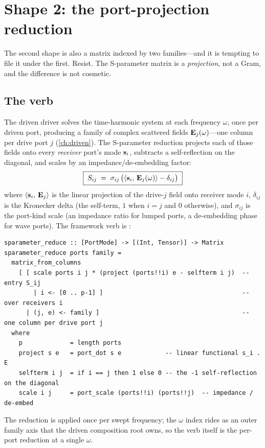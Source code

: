 \section{Shape 2: the port-projection reduction}
\label{sec:proj}

The second shape is also a matrix indexed by two families---and it is tempting to
file it under the first. Resist. The S-parameter matrix is a \emph{projection},
not a Gram, and the difference is not cosmetic.

\subsection{The verb}

The driven driver solves the time-harmonic system at each frequency $\omega$,
once per driven port, producing a family of complex scattered fields
$\mathbf{E}_j(\omega)$---one column per drive port $j$ (\cref{ch:driven}). The
S-parameter reduction projects each of those fields onto every \emph{receiver}
port's mode $\mathbf{s}_i$, subtracts a self-reflection on the diagonal, and scales by
an impedance/de-embedding factor:
\begin{equation}
  \boxed{\;S_{ij} \;=\; \sigma_{ij}\,\bigl(\left\langle \mathbf{s}_i,\, \mathbf{E}_j(\omega)\right\rangle - \delta_{ij}\bigr)\;}
  \label{eq:sparam-entry}
\end{equation}
where $\left\langle \mathbf{s}_i,\, \mathbf{E}_j\right\rangle$ is the linear projection of the drive-$j$ field onto
receiver mode $i$, $\delta_{ij}$ is the Kronecker delta (the self-term, $1$ when
$i=j$ and $0$ otherwise), and $\sigma_{ij}$ is the port-kind scale (an impedance
ratio for lumped ports, a de-embedding phase for wave ports). The framework verb
is :
\begin{lstlisting}[style=l4style]
sparameter_reduce :: [PortMode] -> [(Int, Tensor)] -> Matrix
sparameter_reduce ports family =
  matrix_from_columns
    [ [ scale ports i j * (project (ports!!i) e - selfterm i j)  -- entry S_ij
        | i <- [0 .. p-1] ]                                      -- over receivers i
      | (j, e) <- family ]                                       -- one column per drive port j
  where
    p             = length ports
    project s e   = port_dot s e            -- linear functional s_i . E
    selfterm i j  = if i == j then 1 else 0 -- the -1 self-reflection on the diagonal
    scale i j     = port_scale (ports!!i) (ports!!j)  -- impedance / de-embed
\end{lstlisting}
The reduction is applied once per swept frequency; the $\omega$ index rides as an
outer family axis that the driven composition root owns, so the verb itself is
the per-port reduction at a single $\omega$.

